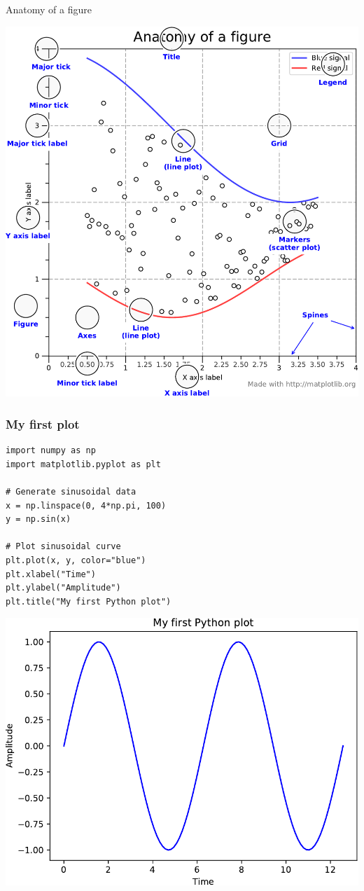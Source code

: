 \documentclass[pdf]{beamer}
\begin{document}
\begin{frame}{Anatomy of a figure}

\begin{center}
	\includegraphics[width=.6\textwidth]{anatomy_figure.pdf}
\end{center}
\end{frame}

\begin{frame}[fragile]
\frametitle{My first plot}

\begin{lstlisting}[style=python]
import numpy as np
import matplotlib.pyplot as plt

# Generate sinusoidal data
x = np.linspace(0, 4*np.pi, 100)
y = np.sin(x)

# Plot sinusoidal curve
plt.plot(x, y, color="blue")
plt.xlabel("Time")
plt.ylabel("Amplitude")
plt.title("My first Python plot")
\end{lstlisting}

\vspace{-0.5cm}
\begin{center}
	\includegraphics[width=.35\textwidth]{plot1.pdf}
\end{center}

\end{frame}
\end{document}
